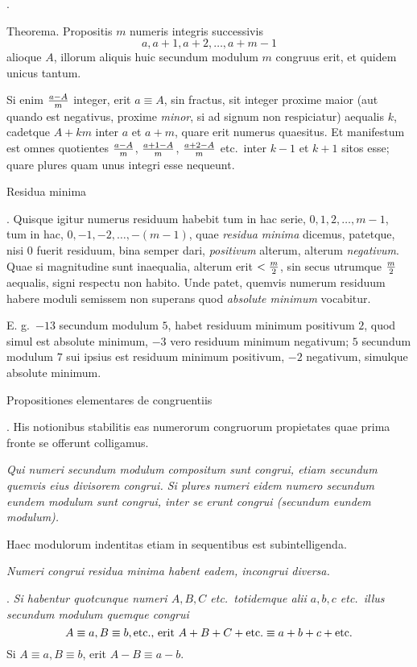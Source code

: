 .

\proclaim Theorema. Propositis $m$ numeris integris successivis
$$ a, a+1, a+2, \ldots, a+m-1$$
alioque $A$, illorum aliquis huic secundum modulum $m$ congruus erit, et quidem unicus tantum.

Si enim ${a-A\over m}$ integer, erit $a\equiv A$, sin fractus, sit integer proxime maior (aut quando est negativus, proxime {\it minor}, si ad signum non respiciatur) aequalis $k$, cadetque $A+km$ inter $a$ et $a+m$, quare erit numerus quaesitus. Et manifestum est omnes quotientes ${a-A \over m}$, ${a+1-A\over m}$, ${a+2-A\over m}$ etc.\ inter $k-1$ et $k+1$ sitos esse; quare plures quam unus integri esse nequeunt.

\ssection Residua minima

. Quisque igitur numerus residuum habebit tum in hac serie, $0,1,2,\ldots,m-1$, tum in hac, $0,-1,-2,\ldots,\allowbreak -(m-1)$, quae {\it residua minima} dicemus, patetque, nisi $0$ fuerit residuum, bina semper dari, {\it positivum} alterum, alterum {\it negativum}. Quae si magnitudine sunt inaequalia, alterum erit $<{m\over 2}$, sin secus utrumque ${m\over 2}$ aequalis, signi respectu non habito. Unde patet, quemvis numerum residuum habere moduli semissem non superans quod {\it absolute minimum} vocabitur.

E. g.\ $-13$ secundum modulum $5$, habet residuum minimum positivum $2$, quod simul est absolute minimum, $-3$ vero residuum minimum negativum; $5$ secundum modulum $7$ sui ipsius est residuum minimum positivum, $-2$ negativum, simulque absolute minimum.

\ssection Propositiones elementares de congruentiis

. His notionibus stabilitis eas numerorum congruorum propietates quae prima fronte se offerunt colligamus.

{\sl Qui numeri secundum modulum compositum sunt congrui, etiam secundum quemvis eius divisorem congrui. Si plures numeri eidem numero secundum eundem modulum sunt congrui, inter se erunt congrui (secundum eundem modulum).}

Haec modulorum indentitas etiam in sequentibus est subintelligenda.

{\sl Numeri congrui residua minima habent eadem, incongrui diversa.}

. {\sl Si habentur quotcunque numeri $A,B,C$ etc.\ totidemque alii $a,b,c$ etc.\ illus secundum modulum quemque congrui
$$A\equiv a, B\equiv b,\hbox{etc., erit}\ A+B+C+\hbox{etc.}\equiv a+b+c+\hbox{etc.}$$}
Si $A\equiv a, B\equiv b$, erit $A-B \equiv a-b$.

